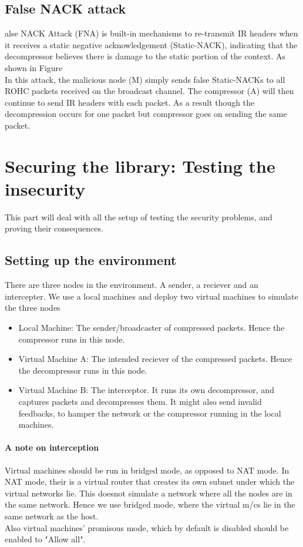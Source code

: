 \documentclass[a4paper,11pt]{article}
\begin{document}
\subsection{False NACK attack}
alse NACK Attack (FNA) is  built-in mechanisms to re-transmit IR headers
when it receives a static negative acknowledgement (Static-NACK), indicating that the decompressor believes there is
damage to the static portion of the context. As shown in Figure\\
In this attack, the malicious node (M) simply sends false Static-NACKs to all ROHC packets received on the broadcast channel. The compressor (A) will then continue to send IR headers with each packet. As a result though the decompression occurs for one packet but compressor goes on sending the same packet.
\pagebreak



\section{Securing the library: Testing the insecurity}
This part will deal with all the setup of testing the security problems, and proving their consequences.
\subsection{Setting up the environment}
There are three nodes in the environment. A sender, a reciever and an intercepter. We use a local machines and deploy two virtual machines
to simulate the three nodes
\begin{itemize}
	\item Local Machine: The sender/broadcaster of compressed packets. Hence the compressor runs in this node.
	\item Virtual Machine A: The intended reciever of the compressed packets. Hence the decompressor runs in this node.
	\item Virtual Machine B: The interceptor. It runs its own decompressor, and captures packets and decompresses them. It might also send
	invalid feedbacks, to hamper the network or the compressor running in the local machines.
\end{itemize}

\paragraph{A note on interception} 
Virtual machines should be run in bridged mode, as opposed to NAT mode. In NAT mode, their is a virtual router that creates
its own subnet under which the virtual networks lie. This doesnot simulate a network where all the nodes
are in the same network. Hence we use bridged mode, where the virtual m/cs lie in the same network as the host. \\
Also virtual machines' promisous mode, which by default is disabled should be enabled to "Allow all".
\end{document}
